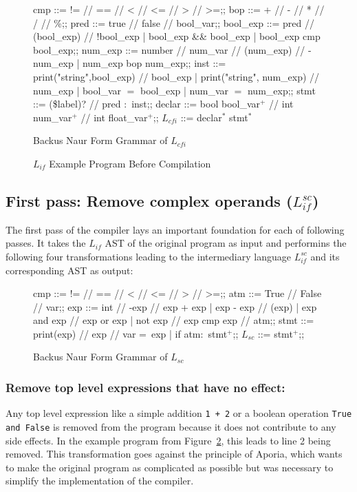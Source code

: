 \begin{figure}[h!]
	\centering
	\begin{bnf}[row{-} = {bg = gray9}]
		cmp ::= != // == // < // <= // > // >=;;
		bop ::= + // - // * // / // \%;;
		pred ::= true // false // bool\_var;;
		bool\_exp ::= pred // (bool\_exp) // !bool\_exp
		| bool\_exp \&\& bool\_exp
		| bool\_exp cmp bool\_exp;;
		num\_exp ::= number // num\_var // (num\_exp) // -num\_exp
		| num\_exp bop num\_exp;;
		inst ::= print("string",bool\_exp) // bool\_exp
		| print("string", num\_exp) // num\_exp
		| bool\_var $=$ bool\_exp
		| num\_var $=$ num\_exp;;
		stmt ::= (\$label)? // pred $\colon$ inst;;
		declar ::= bool bool\_var$^+$ // int num\_var$^+$ // int float\_var$^+$;;
		$L_{cfi}$ ::= declar$^*$ stmt$^*$
	\end{bnf}
	\caption{Backus Naur Form Grammar of $L_{cfi}$}
	\label{bnf:lcfi}
\end{figure}

\begin{figure}[h!]
	\centering
	
	\caption{$L_{if}$ Example Program Before Compilation}
	\label{code:lif}
\end{figure}

\subsection{First pass: Remove complex operands ($L_{if}^{sc}$)}


The first pass of the compiler lays an important foundation for each of following passes. It takes the $L_{if}$ AST of the original program as input and performins the following four transformations leading to the intermediary language $L_{if}^{sc}$ and its corresponding AST as output:

\begin{figure}[h!]
	\centering
	\begin{bnf}[row{-} = {bg = gray9}]
		cmp ::= != // == // < // <= // > // >=;;
		atm ::= True // False // var;;
		exp ::= int  // -exp // exp + exp 
		| exp - exp // (exp)
		| exp and exp // exp or exp 
		| not exp // exp cmp exp // atm;;
		stmt ::= print(exp) // exp // var = exp
		| if atm$\colon$ stmt$^+$;;
		$L_{sc}$ ::= stmt$^+$;;
	\end{bnf}
	\caption{Backus Naur Form Grammar of $L_{sc}$}
	\label{bnf:sc}
\end{figure}

\subsubsection{Remove top level expressions that have no effect:}
Any top level expression like a simple addition \texttt{1 + 2} or a boolean operation \texttt{True and False} is removed from the program because it does not contribute to any side effects. In the example program from Figure~\ref{code:lif}, this leads to line 2 being removed.
This transformation goes against the principle of Aporia, which wants to make the original program as complicated as possible but was necessary to simplify the implementation of the compiler.

